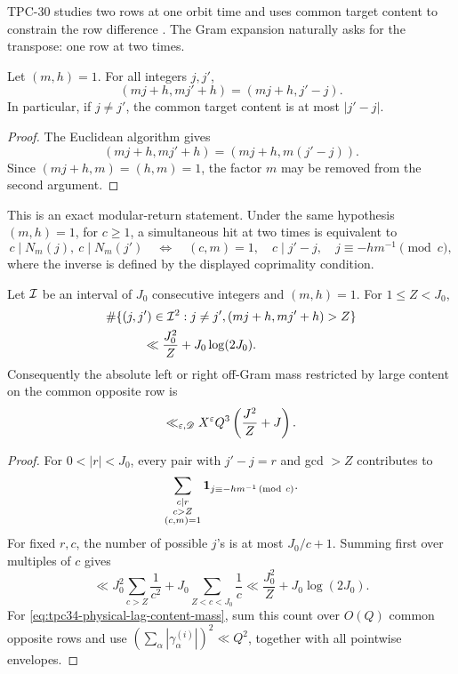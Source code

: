 TPC-30 studies two rows at one orbit time and uses common target content
to constrain the row difference \citep{WangTPC30}.  The Gram expansion
naturally asks for the transpose: one row at two times.

\begin{lemma}
\label{lem:tpc34-two-time-content}
Let \((m,h)=1\).  For all integers \(j,j'\),
\begin{equation}
 \boxed{
 (mj+h,mj'+h)=(mj+h,j'-j).}
 \label{eq:tpc34-two-time-gcd}
\end{equation}
In particular, if \(j\ne j'\), the common target content is at most
\(|j'-j|\).
\end{lemma}

\begin{proof}
The Euclidean algorithm gives
\[
 (mj+h,mj'+h)=(mj+h,m(j'-j)).
\]
Since \((mj+h,m)=(h,m)=1\), the factor \(m\) may be removed from the
second argument.
\end{proof}

This is an exact modular-return statement.  Under the same hypothesis
\((m,h)=1\), for \(c\ge1\), a simultaneous hit at two times is equivalent
to
\begin{equation}
 c\mid N_m(j),\ c\mid N_m(j')
 \quad\Longleftrightarrow\quad
 (c,m)=1,\quad c\mid j'-j,\quad
 j\equiv-hm^{-1}\pmod c,
 \label{eq:tpc34-modular-return}
\end{equation}
where the inverse is defined by the displayed coprimality condition.

\begin{proposition}
\label{prop:tpc34-large-lag-content}
Let \(\mathcal I\) be an interval of \(J_0\) consecutive integers and
\((m,h)=1\).  For \(1\le Z<J_0\),
\begin{align}
 &\#\{(j,j')\in\mathcal I^2:j\ne j',
 (mj+h,mj'+h)>Z\}
 \notag\\
 &\hspace{3em}\ll
 \frac{J_0^2}{Z}+J_0\log(2J_0).
 \label{eq:tpc34-large-lag-count}
\end{align}
Consequently the absolute left or right off-Gram mass restricted by
large content on the common opposite row is
\begin{equation}
 \ll_{\varepsilon,\mathscr D}
 X^\varepsilon Q^3\left(\frac{J^2}{Z}+J\right).
 \label{eq:tpc34-physical-lag-content-mass}
\end{equation}
\end{proposition}

\begin{proof}
For \(0<|r|<J_0\), every pair with \(j'-j=r\) and gcd \(>Z\) contributes
to
\[
 \sum_{\substack{c\mid r\\c>Z\\(c,m)=1}}
 \mathbf 1_{j\equiv-hm^{-1}\,(\mathrm{mod}\ c)}.
\]
For fixed \(r,c\), the number of possible \(j\)'s is at most
\(J_0/c+1\).  Summing first over multiples of \(c\) gives
\[
 \ll
 J_0^2\sum_{c>Z}\frac1{c^2}
 +J_0\sum_{Z<c<J_0}\frac1c
 \ll \frac{J_0^2}{Z}+J_0\log(2J_0).
\]
For \eqref{eq:tpc34-physical-lag-content-mass}, sum this count over
\(O(Q)\) common opposite rows and use
\((\sum_\alpha|\gamma_\alpha^{(i)}|)^2\ll Q^2\), together with all
pointwise envelopes.
\end{proof}

